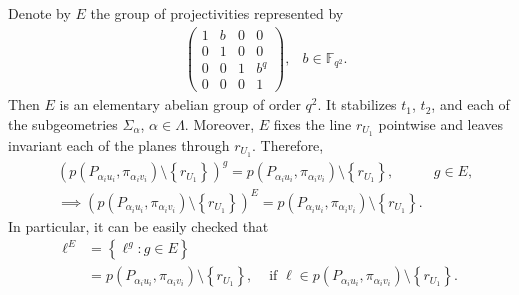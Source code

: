 \documentclass[11pt]{article}
\theoremstyle{definition}
\numberwithin{equation}{section}
\def\F{{\mathbb F}}
\begin{document}
Denote by $E$ the group of projectivities represented by 
\begin{align*}
    & \begin{pmatrix}
        1 & b & 0 & 0 \\
        0 & 1 & 0 & 0 \\
        0 & 0 & 1 & b^q \\
        0 & 0 & 0 & 1
    \end{pmatrix}, & b \in \F_{q^2}. 
\end{align*}
Then $E$ is an elementary abelian group of order $q^2$. It stabilizes $t_1$, $t_2$, and each of the subgeometries $\Sigma_{\alpha}$, $\alpha \in \Lambda$. Moreover, $E$ fixes the line $r_{U_1}$ pointwise and leaves invariant each of the planes through $r_{U_1}$. Therefore, 
\begin{align*}
& \left(p\left(P_{\alpha_i u_i}, \pi_{\alpha_i v_i}\right) \setminus \left\{ r_{U_1} \right\} \right)^g = p\left(P_{\alpha_i u_i}, \pi_{\alpha_i v_i}\right) \setminus \left\{ r_{U_1} \right\}, & g \in E,  \\
& \implies \left(p\left(P_{\alpha_i u_i}, \pi_{\alpha_i v_i}\right) \setminus \left\{ r_{U_1} \right\} \right)^E = p\left(P_{\alpha_i u_i}, \pi_{\alpha_i v_i}\right) \setminus \left\{ r_{U_1} \right\}. & 
\end{align*}
In particular, it can be easily checked that
\begin{align*}
    \ell^E & = \left\{ \ell^g \colon g \in E \right\} & \\
    & = p\left(P_{\alpha_i u_i}, \pi_{\alpha_i v_i}\right) \setminus \left\{ r_{U_1} \right\}, & \mbox{ if } \ell \in p\left(P_{\alpha_i u_i}, \pi_{\alpha_i v_i}\right) \setminus \left\{r_{U_1}\right\}. 
\end{align*}
\end{document}
